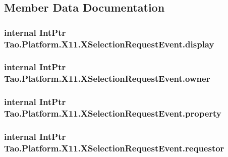 \subsection{Member Data Documentation}
\hypertarget{struct_tao_1_1_platform_1_1_x11_1_1_x_selection_request_event_a9c566a379d798fa1e2c8f94ea88c9fbb}{
\subsubsection[{display}]{\setlength{\rightskip}{0pt plus 5cm}internal IntPtr {\bf Tao.Platform.X11.XSelectionRequestEvent.display}}}
\label{struct_tao_1_1_platform_1_1_x11_1_1_x_selection_request_event_a9c566a379d798fa1e2c8f94ea88c9fbb}
\hypertarget{struct_tao_1_1_platform_1_1_x11_1_1_x_selection_request_event_a1882f5717ce292c7f3db066f0f95f676}{
\subsubsection[{owner}]{\setlength{\rightskip}{0pt plus 5cm}internal IntPtr {\bf Tao.Platform.X11.XSelectionRequestEvent.owner}}}
\label{struct_tao_1_1_platform_1_1_x11_1_1_x_selection_request_event_a1882f5717ce292c7f3db066f0f95f676}
\hypertarget{struct_tao_1_1_platform_1_1_x11_1_1_x_selection_request_event_a42d17fe564ea80b714693fdcf4541e07}{
\subsubsection[{property}]{\setlength{\rightskip}{0pt plus 5cm}internal IntPtr {\bf Tao.Platform.X11.XSelectionRequestEvent.property}}}
\label{struct_tao_1_1_platform_1_1_x11_1_1_x_selection_request_event_a42d17fe564ea80b714693fdcf4541e07}
\hypertarget{struct_tao_1_1_platform_1_1_x11_1_1_x_selection_request_event_af7571460492fd6dc97656edaca14ae94}{
\subsubsection[{requestor}]{\setlength{\rightskip}{0pt plus 5cm}internal IntPtr {\bf Tao.Platform.X11.XSelectionRequestEvent.requestor}}}
